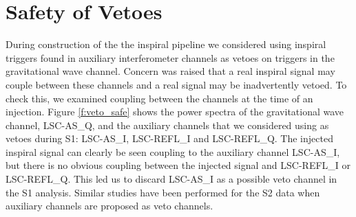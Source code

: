 \section{Safety of Vetoes}
\label{s:safety}

During construction of the the inspiral pipeline we considered using inspiral
triggers found in auxiliary interferometer channels as vetoes on triggers in
the gravitational wave channel. Concern was raised that a real inspiral signal
may couple between these channels and a real signal may be inadvertently
vetoed.  To check this, we examined coupling between the channels at the time
of an injection.  Figure \ref{f:veto_safe} shows the power spectra of the
gravitational wave channel, LSC-AS\_Q, and the auxiliary channels that we
considered using as vetoes during S1: LSC-AS\_I, LSC-REFL\_I and
LSC-REFL\_Q.  The injected inspiral signal can clearly be seen coupling
to the auxiliary channel LSC-AS\_I, but there is no obvious coupling
between the injected signal and LSC-REFL\_I or LSC-REFL\_Q. This
led us to discard LSC-AS\_I as a possible veto channel in the S1
analysis. Similar studies have been performed for the S2 data when auxiliary
channels are proposed as veto channels.

\newpage

